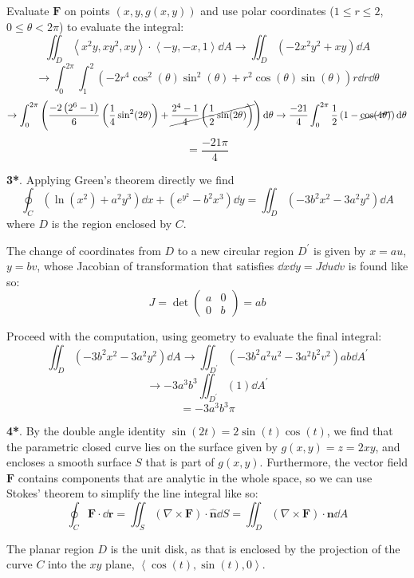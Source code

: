 \documentclass[11pt]{article}
\newcommand{\br}[1]{\left(#1\right)}
\begin{document}
Evaluate $\mathbf{F}$ on points $(x,y,g(x,y))$ and use polar coordinates ($1 \leq r \leq 2$, $0 \leq \theta < 2\pi$) to evaluate the integral:
$$\iint_D \left\langle x^2y, xy^2 , xy \right\rangle \cdot \left\langle -y, -x ,1 \right\rangle \dd{A} \to \iint_D \br{-2x^2y^2 + xy}\dd{A}$$
$$ \to \int_0^{2\pi}\int_1^2 \br{-2r^4\cos^2(\theta)\sin^2(\theta) + r^2\cos(\theta)\sin(\theta)}r\dd{r}\dd{\theta} $$
$$\to \int_0^{2\pi}\br{\frac{-2\br{2^6-1}}{6}\br{\frac{1}{4}\sin^2(2\theta)} + \cancel{\frac{2^4-1}{4}\br{\frac{1}{2}\sin(2\theta)}}}\dd{\theta} \to \frac{-21}{4}\int_0^{2\pi}\frac{1}{2}\br{1-\cancel{\cos(4\theta)}}\dd{\theta}$$
$$\boxed{=\frac{-21\pi}{4}}$$

\noindent\makebox[\linewidth]{\rule{19.1cm}{0.4pt}}

\textbf{3*}. Applying Green's theorem directly we find
$$\oint_C \br{\ln(x^2)+a^2y^3}\dd{x} + \br{e^{y^2}-b^2x^3}\dd{y} = \iint_D \br{-3b^2x^2 - 3a^2y^2} \dd{A}$$ where $D$ is the region enclosed by $C$.

The change of coordinates from $D$ to a new circular region $D^{\prime}$ is given by $x = au$, $y = bv$, whose Jacobian of transformation that satisfies $\dd{x}\dd{y} = J\dd{u}\dd{v}$ is found like so:
$$J = \det \begin{pmatrix}
    a & 0 \\
    0 & b
\end{pmatrix} = ab$$

Proceed with the computation, using geometry to evaluate the final integral:
$$\iint_D \br{-3b^2x^2 - 3a^2y^2} \dd{A} \to \iint_{D^{\prime}} \br{-3b^2a^2u^2 - 3a^2b^2v^2} ab \dd{A^{\prime}}$$
$$\to -3a^3b^3\iint_{D^{\prime}} \br{1} \dd{A^{\prime}}$$
$$\boxed{= -3a^3b^3\pi}$$

\noindent\makebox[\linewidth]{\rule{19.1cm}{0.4pt}}

\textbf{4*}. By the double angle identity $\sin(2t) = 2\sin(t)\cos(t)$, we find that the parametric closed curve lies on the surface given by $g(x,y) = z = 2xy$, and encloses a smooth surface $S$ that is part of $g(x,y)$. Furthermore, the vector field $\mathbf{F}$ contains components that are analytic in the whole space, so we can use Stokes' theorem to simplify the line integral like so:
$$\oint_C \mathbf{F}\cdot \dd{\mathbf{r}} = \iint_S \br{\nabla \times \mathbf{F}}\cdot \hat{\mathbf{n}} \dd{S} = \iint_D \br{\nabla \times \mathbf{F}}\cdot \mathbf{n} \dd{A}$$

The planar region $D$ is the unit disk, as that is enclosed by the projection of the curve $C$ into the $xy$ plane, $\left\langle \cos(t), \sin(t), 0 \right\rangle$.
\end{document}
